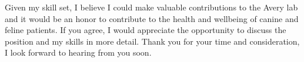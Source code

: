 \documentclass[11pt,a4paper,sans]{moderncv}
\begin{document}
\begin{spacing}{1.1}
Given my skill set, I believe I could make valuable contributions to the Avery lab and it would be an honor to contribute to the health and wellbeing of canine and feline patients. 
If you agree, I would appreciate the opportunity to discuss the position and my skills in more detail. 
Thank you for your time and consideration, I look forward to hearing from you soon.


 

\end{spacing}
\makeletterclosing
\end{document}
